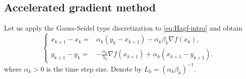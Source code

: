 \documentclass[10pt]{amsart}
\begin{document}
\subsection{Accelerated gradient method}\label{sec:HNAG-GS-2}
Let us apply the Gauss-Seidel type discretization to \eqref{eq:Hagf-intro} and obtain
\begin{equation}\label{eq:ex-HNAG}
	\left\{
	\begin{aligned}
		x_{k+1}-x_{k}={}& \alpha_k \left (y_{k}-x_{k+1}\right ) - \alpha_k \beta_k\nabla f(x_{k}),\\
 y_{k+1}-y_{k}={}&
		-\frac{\alpha_k}{\lambda_k}\nabla f(x_{k+1}) + \alpha_k \left ( x_{k+1} - y_{k+1}\right ).
	\end{aligned}
	\right.
\end{equation}
where $\alpha_k>0$ is the time step size. Denote by $L_k = (\alpha_k\beta_k)^{-1}$. 
\end{document}
